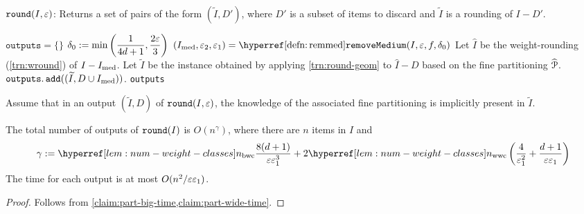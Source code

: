 \begin{algorithm}[htb]
\caption{$\operatorname{\mathtt{round}}(I, \varepsilon)$: Returns a set of pairs of the form $(\widetilde{I}, D')$,
where $D'$ is a subset of items to discard and $\widetilde{I}$ is a rounding of $I-D'$.}
\label{algo:round}
\begin{algorithmic}[1]
\State $\texttt{outputs} = \{\}$
\State $\delta_0 := {\displaystyle \min\left(\frac{1}{4d+1}, \frac{2\varepsilon}{3}\right)}$
\State $(\Imed, \epsSmall, \epsLarge) = \remMedHyp(I, \eps, f, \delta_0)$
\State Let $\widehat{I}$ be the weight-rounding (\cref{trn:wround}) of $I - I_{\mathrm{med}}$.
    \State Let $\widetilde{I}$ be the instance obtained by applying \cref{trn:round-geom}
        to $\widehat{I} - D$ based on the fine partitioning $\widehat{\mathcal{P}}$.
    \State $\operatorname{\mathtt{outputs.add}}((\widetilde{I}, D \cup I_{\mathrm{med}}))$.
\EndFor
\State \Return \texttt{outputs}
\end{algorithmic}
\end{algorithm}

Assume that in an output $(\widetilde{I}, D)$ of $\operatorname{\mathtt{round}}(I, \varepsilon)$,
the knowledge of the associated fine partitioning is implicitly present in $\widetilde{I}$.

\begin{lemma}
\label{lem:round-time}
The total number of outputs of $\operatorname{\mathtt{round}}(I)$ is $O(n^\gamma)$,
where there are $n$ items in $I$ and
\[ \gamma \defeq \nbwcHyp\frac{8(d+1)}{\eps\epsLarge^3}
    + 2\nwwcHyp\left(\frac{4}{\epsLarge^2} + \frac{d+1}{\eps\epsLarge}\right) \]
The time for each output is at most $O(n^2/\varepsilon\varepsilon_1)$.
\end{lemma}
\begin{proof}
Follows from \cref{claim:part-big-time,claim:part-wide-time}.
\end{proof}

